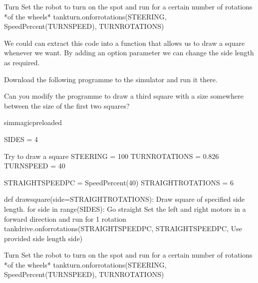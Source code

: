 \documentclass[letterpaper,10pt,english]{sphinxmanual}
\begin{document}
{{\begin{sphinxVerbatim}[commandchars=\\\{\}]
    \PYGZsh{}Turn
    \PYGZsh{} Set the robot to turn on the spot
    \PYGZsh{} and run for a certain number of rotations *of the wheels*
    tank\PYGZus{}turn.on\PYGZus{}for\PYGZus{}rotations(STEERING,
                               SpeedPercent(TURN\PYGZus{}SPEED),
                               TURN\PYGZus{}ROTATIONS)
\end{sphinxVerbatim}
}

We could can extract this code into a function that allows us to draw a square whenever we want. By adding an option  parameter we can change the side length as required.

Download the following programme to the simulator and run it there.

Can you modify the programme to draw a third square with a size somewhere between the size of the first two squares?

{
\begin{sphinxVerbatim}[commandchars=\\\{\}]
\llap{\color{nbsphinxin}[ ]:\,\hspace{\fboxrule}\hspace{\fboxsep}}\PYGZpc{}\PYGZpc{}sim\PYGZus{}magic\PYGZus{}preloaded

SIDES = 4

\PYGZsh{} Try to draw a square
STEERING = \PYGZhy{}100
TURN\PYGZus{}ROTATIONS = 0.826
TURN\PYGZus{}SPEED = 40

STRAIGHT\PYGZus{}SPEED\PYGZus{}PC = SpeedPercent(40)
STRAIGHT\PYGZus{}ROTATIONS = 6

def draw\PYGZus{}square(side=STRAIGHT\PYGZus{}ROTATIONS):
    \PYGZdq{}\PYGZdq{}\PYGZdq{}Draw square of specified side length.\PYGZdq{}\PYGZdq{}\PYGZdq{}
    for side in range(SIDES):
        \PYGZsh{}Go straight
        \PYGZsh{} Set the left and right motors in a forward direction
        \PYGZsh{} and run for 1 rotation
        tank\PYGZus{}drive.on\PYGZus{}for\PYGZus{}rotations(STRAIGHT\PYGZus{}SPEED\PYGZus{}PC,
                                    STRAIGHT\PYGZus{}SPEED\PYGZus{}PC,
                                    \PYGZsh{}Use provided side length
                                    side)

        \PYGZsh{}Turn
        \PYGZsh{} Set the robot to turn on the spot
        \PYGZsh{} and run for a certain number of rotations *of the wheels*
        tank\PYGZus{}turn.on\PYGZus{}for\PYGZus{}rotations(STEERING,
                                   SpeedPercent(TURN\PYGZus{}SPEED),
                                   TURN\PYGZus{}ROTATIONS)



\end{sphinxVerbatim}}}
\end{document}
